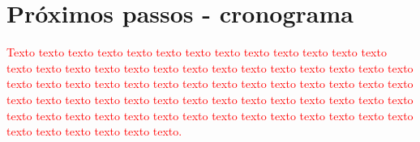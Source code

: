 \documentclass[normaltoc, espacoumemeio, pnumromarab,ruledheader]{abnt}
\begin{document}




\section{Próximos passos - cronograma}


\textcolor{red}{Texto texto texto texto texto texto texto texto texto texto texto texto texto texto texto texto texto texto texto texto texto texto texto texto texto texto texto texto texto texto texto texto texto texto texto texto texto texto texto texto texto texto texto texto texto texto texto texto texto texto texto texto texto texto texto texto texto texto texto texto texto texto texto texto texto texto texto texto texto texto texto texto texto texto texto.}
\end{document}
